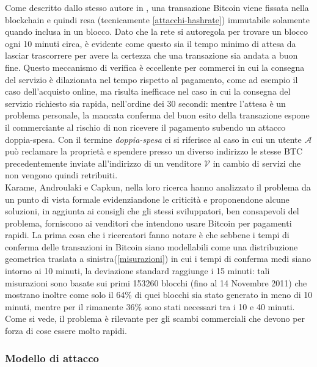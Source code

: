 Come descritto dallo stesso autore in \cite{bitcoin}, una transazione Bitcoin viene fissata nella blockchain e quindi resa (tecnicamente \ref{attacchi-hashrate}) immutabile solamente quando inclusa in un blocco. Dato che la rete si autoregola per trovare un blocco ogni 10 minuti circa, è evidente come questo sia il tempo minimo di attesa da lasciar trascorrere per avere la certezza che una transazione sia andata a buon fine. Questo meccanismo di verifica è eccellente per commerci in cui la consegna del servizio è dilazionata nel tempo rispetto al pagamento, come ad esempio il caso dell'acquisto online, ma risulta inefficace nel caso in cui la consegna del servizio richiesto sia rapida, nell'ordine dei 30 secondi: mentre l'attesa è un problema personale, la mancata conferma del buon esito della transazione espone il commerciante al rischio di non ricevere il pagamento subendo un attacco doppia-spesa. Con il termine \emph{doppia-spesa} ci si riferisce al caso in cui un utente $\mathcal{A}$ può reclamare la proprietà e spendere presso un diverso indirizzo le stesse BTC precedentemente inviate all'indirizzo di un venditore $\mathcal{V}$ in cambio di servizi che non vengono quindi retribuiti.\\
Karame, Androulaki e Capkun, nella loro ricerca \cite{doublespendig_fast} hanno analizzato il problema da un punto di vista formale evidenziandone le criticità e proponendone alcune soluzioni, in aggiunta ai consigli che gli stessi sviluppatori, ben consapevoli del problema, forniscono ai venditori che intendono usare Bitcoin per pagamenti rapidi.
La prima cosa che i ricercatori fanno notare è che sebbene i tempi di conferma delle transazioni in Bitcoin siano modellabili come una distribuzione geometrica traslata a sinistra(\ref{misurazioni}) in cui i tempi di conferma medi siano intorno ai 10 minuti, la deviazione standard raggiunge i 15 minuti: tali misurazioni sono basate sui primi 153260 blocchi (fino al 14 Novembre 2011) che mostrano inoltre come solo il 64\% di quei blocchi sia stato generato in meno di 10 minuti, mentre per il rimanente 36\% sono stati necessari tra i 10 e 40 minuti. Come si vede, il problema è rilevante per gli scambi commerciali che devono per forza di cose essere molto rapidi.

\subsubsection{Modello di attacco}

